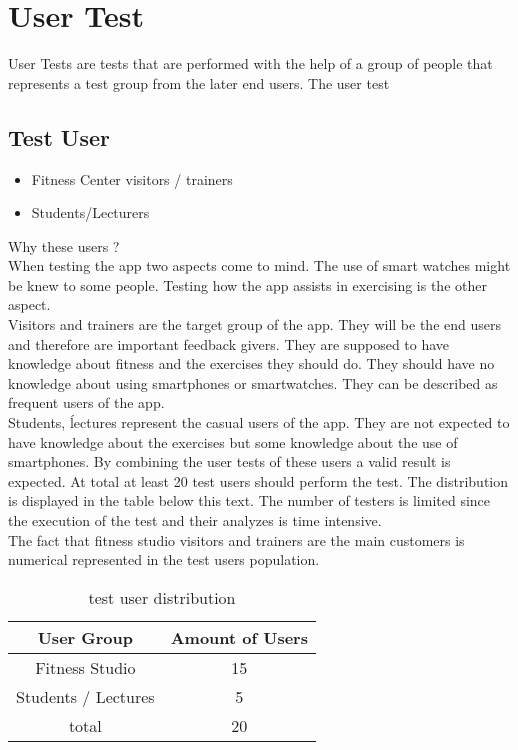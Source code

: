 \section{User Test}
User Tests are tests that are performed with the help of a group of people that represents a test group from the later end users. The user test
\subsection{Test User}
\begin{itemize}
 \item Fitness Center visitors / trainers
 \item Students/Lecturers
 \end{itemize}

Why these users ?\\
When testing the app two aspects come to mind. The use of smart watches might be knew to some people. Testing how the app assists in exercising is the other aspect.\\
Visitors and trainers are the target group of the app. They will be the end users and therefore are important feedback givers. They are supposed to have knowledge about fitness and the exercises they should do. They should have no knowledge about using smartphones or smartwatches. They can be described as frequent users of the app. \\
Students, ĺectures represent the casual users of the app. They are not expected to have knowledge about the exercises but some knowledge about the use of smartphones.
By combining the user tests of these users a valid result is expected.
At total at least 20 test users should perform the test. The distribution is displayed in the table below this text. The number of testers is limited since the execution of the test and their analyzes is time intensive.\\
The fact that fitness studio visitors and trainers are the main customers is numerical represented in the test users population.
\begin{table}
\begin{tabular}{|c|c|}
\hline
User Group & Amount of Users \\ \hline
Fitness Studio & 15 \\ \hline
Students / Lectures &  5 \\ \hline
total  & 20 \\ \hline
\end{tabular}
\caption{test user distribution}
\end{table}
